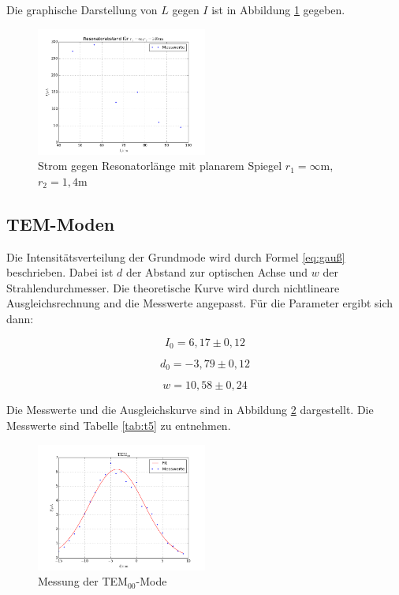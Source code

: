 \noindent Die graphische Darstellung von \(L\) gegen \(I\) ist in Abbildung \ref{fig:stabil2} gegeben.

\begin{figure}
	\centering
		\includegraphics[width=0.5\textwidth]{plots/stabil2}
	\caption{Strom gegen Resonatorlänge mit planarem Spiegel \(r_1=\infty\)m, \(r_2=1,4\)m}
	\label{fig:stabil2}
\end{figure}

\subsection{TEM-Moden}
Die Intensitätsverteilung der Grundmode wird durch Formel \ref{eq:gauß} beschrieben. Dabei ist \(d\) der Abstand zur optischen Achse und \(w\) der Strahlendurchmesser. Die theoretische Kurve wird durch nichtlineare Ausgleichsrechnung and die Messwerte angepasst. Für die Parameter ergibt sich dann:


\begin{equation*}
I_0=6,17\pm0,12
\end{equation*}

\begin{equation*}
d_0=-3,79\pm0,12
\end{equation*}

\begin{equation*}
w=10,58\pm0,24
\end{equation*}

\noindent Die Messwerte und die Ausgleichskurve sind in Abbildung \ref{fig:TEM00} dargestellt. Die Messwerte sind Tabelle \ref{tab:t5} zu entnehmen.

\begin{figure}
	\centering
	\includegraphics[width=0.5\textwidth]{plots/TEM00}
	\caption{Messung der TEM\(_{00}\)-Mode}
	\label{fig:TEM00}
\end{figure}

